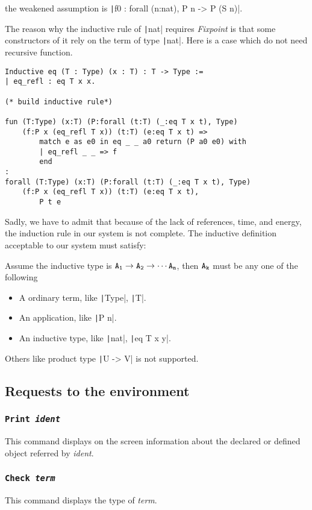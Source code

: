 the weakened assumption is \texttt|f0 : forall (n:nat), P n -> P (S n)|.\par
The reason why the inductive rule of \texttt|nat| requires {\it Fixpoint} is that some constructors of it
rely on the term of type \texttt|nat|. Here is a case which do not need recursive function.
\begin{center}
\begin{verbatim}
Inductive eq (T : Type) (x : T) : T -> Type :=
| eq_refl : eq T x x.

(* build inductive rule*)

fun (T:Type) (x:T) (P:forall (t:T) (_:eq T x t), Type) 
    (f:P x (eq_refl T x)) (t:T) (e:eq T x t) => 
        match e as e0 in eq _ _ a0 return (P a0 e0) with 
        | eq_refl _ _ => f
        end
: 
forall (T:Type) (x:T) (P:forall (t:T) (_:eq T x t), Type) 
    (f:P x (eq_refl T x)) (t:T) (e:eq T x t),
        P t e
\end{verbatim}
\end{center}
Sadly, we have to admit that because of the lack of references, time, and energy,
the induction rule in our system is not complete.
The inductive definition acceptable to our system must satisfy:\par
Assume the inductive type is $\tt A_1\to A_2\to \cdots A_n$, then $\tt A_k$ must be
any one of the following
\begin{itemize}
\item A ordinary term, like \texttt|Type|, \texttt|T|.
\item An application, like \texttt|P n|.
\item An inductive type, like \texttt|nat|, \texttt|eq T x y|.
\end{itemize}
Others like product type \texttt|U -> V| is not supported.

\subsection{Requests to the environment}
\subsubsection{\tt Print \sl ident}
This command displays on the screen information about the declared or defined object referred by {\sl ident}.
\subsubsection{\tt Check \sl term}
This command displays the type of {\sl term}.


